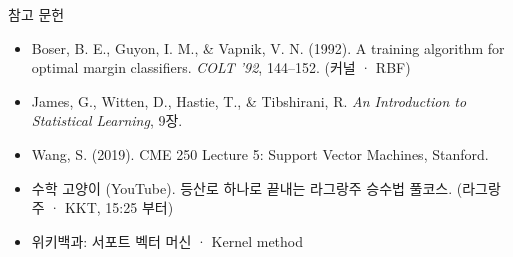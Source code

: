 \documentclass[aspectratio=169,11pt,t]{beamer}
\newcommand{\paperlink}[1]{\href{#1}{\textcolor{ksablue}{\faLink}}}
\begin{document}
\begin{frame}{참고 문헌}
\vfill
\small
\begin{itemize}
\setlength{\itemsep}{0.45em}
\item Boser, B. E., Guyon, I. M., \& Vapnik, V. N. (1992). A training algorithm for optimal margin classifiers. \textit{COLT '92}, 144--152. \;(커널 · RBF) \paperlink{https://doi.org/10.1145/130385.130401}
\item James, G., Witten, D., Hastie, T., \& Tibshirani, R. \textit{An Introduction to Statistical Learning}, 9장. \paperlink{https://doi.org/10.1007/978-1-0716-1418-1}
\item Wang, S. (2019). CME 250 Lecture 5: Support Vector Machines, Stanford. \paperlink{https://web.stanford.edu/class/cme250/files/cme250_lecture5.pdf}
\item 수학 고양이 (YouTube). 등산로 하나로 끝내는 라그랑주 승수법 풀코스. \;(라그랑주 · KKT, 15:25 부터) \paperlink{https://youtu.be/dIS9MtVzZCM?t=925}
\item 위키백과: 서포트 벡터 머신 \paperlink{https://ko.wikipedia.org/wiki/\%EC\%84\%9C\%ED\%8F\%AC\%ED\%8A\%B8_\%EB\%B2\%A1\%ED\%84\%B0_\%EB\%A8\%B8\%EC\%8B\%A0} \;·\; Kernel method \paperlink{https://en.wikipedia.org/wiki/Kernel_method}
\end{itemize}
\vfill
{}
\end{frame}
\end{document}
